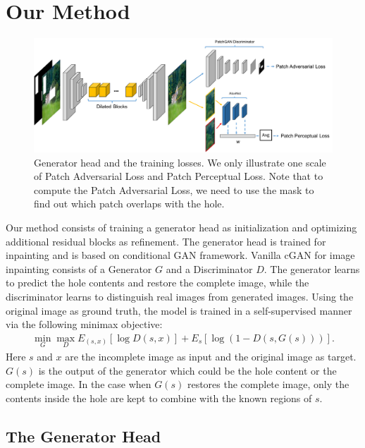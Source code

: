 \section{Our Method}

\begin{figure}[ht!]
\centering
\small
\includegraphics[width=1\textwidth]{figures/arch2.pdf}
\caption{Generator head and the training losses. We only illustrate one scale of Patch Adversarial Loss and Patch Perceptual Loss. Note that to compute the Patch Adversarial Loss, we need to use the mask to find out which patch overlaps with the hole.}
\label{fig:model}
\vspace{-15pt}
\end{figure}

Our method consists of training a generator head as initialization and optimizing additional residual blocks as refinement. The generator head is trained for inpainting and is based on conditional GAN framework. Vanilla cGAN for image inpainting consists of a Generator $G$ and a Discriminator $D$. The generator learns to predict the hole contents and restore the complete image, while the discriminator learns to distinguish real images from generated images. Using the original image as ground truth, the model is trained in a self-supervised manner via the following minimax objective:
\begin{eqnarray}
\min\limits_G \max\limits_D E_{(s,x)}[\log D(s,x)] + E_s[\log (1-D(s,G(s)))].
\end{eqnarray}
Here $s$ and $x$ are the incomplete image as input and the original image as target. $G(s)$ is the output of the generator which could be the hole content or the complete image. In the case when $G(s)$ restores the complete image, only the contents inside the hole are kept to combine with the known regions of $s$.

\subsection{The Generator Head}
\label{sec:resnet_head}

